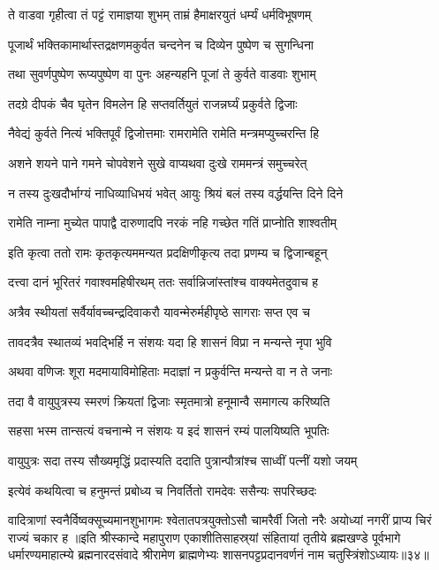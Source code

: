 \twolineshloka
{ते वाडवा गृहीत्वा तं पट्टं रामाज्ञया शुभम्}
{ताम्रं हैमाक्षरयुतं धर्म्यं धर्मविभूषणम्}%

\twolineshloka
{पूजार्थं भक्तिकामार्थास्तद्रक्षणमकुर्वत}
{चन्दनेन च दिव्येन पुष्पेण च सुगन्धिना}%

\twolineshloka
{तथा सुवर्णपुष्पेण रूप्यपुष्पेण वा पुनः}
{अहन्यहनि पूजां ते कुर्वते वाडवाः शुभाम्}%

\twolineshloka
{तदग्रे दीपकं चैव घृतेन विमलेन हि}
{सप्तवर्तियुतं राजन्नर्घ्यं प्रकुर्वते द्विजाः}%

\twolineshloka
{नैवेद्यं कुर्वते नित्यं भक्तिपूर्वं द्विजोत्तमाः}
{रामरामेति रामेति मन्त्रमप्युच्चरन्ति हि}%

\twolineshloka
{अशने शयने पाने गमने चोपवेशने}
{सुखे वाप्यथवा दुःखे राममन्त्रं समुच्चरेत्}%

\twolineshloka
{न तस्य दुःखदौर्भाग्यं नाधिव्याधिभयं भवेत्}
{आयुः श्रियं बलं तस्य वर्द्धयन्ति दिने दिने}%

\twolineshloka
{रामेति नाम्ना मुच्येत पापाद्वै दारुणादपि}
{नरकं नहि गच्छेत गतिं प्राप्नोति शाश्वतीम्}%


\twolineshloka
{इति कृत्वा ततो रामः कृतकृत्यममन्यत}
{प्रदक्षिणीकृत्य तदा प्रणम्य च द्विजान्बहून्}%

\twolineshloka
{दत्त्वा दानं भूरितरं गवाश्वमहिषीरथम्}
{ततः सर्वान्निजांस्तांश्च वाक्यमेतदुवाच ह}%

\twolineshloka
{अत्रैव स्थीयतां सर्वैर्यावच्चन्द्रदिवाकरौ}
{यावन्मेरुर्महीपृष्ठे सागराः सप्त एव च}%

\twolineshloka
{तावदत्रैव स्थातव्यं भवद्भिर्हि न संशयः}
{यदा हि शासनं विप्रा न मन्यन्ते नृपा भुवि}%

\twolineshloka
{अथवा वणिजः शूरा मदमायाविमोहिताः}
{मदाज्ञां न प्रकुर्वन्ति मन्यन्ते वा न ते जनाः}%

\twolineshloka
{तदा वै वायुपुत्रस्य स्मरणं क्रियतां द्विजाः}
{स्मृतमात्रो हनूमान्वै समागत्य करिष्यति}%

\twolineshloka
{सहसा भस्म तान्सत्यं वचनान्मे न संशयः}
{य इदं शासनं रम्यं पालयिष्यति भूपतिः}%

\twolineshloka
{वायुपुत्रः सदा तस्य सौख्यमृद्धिं प्रदास्यति}
{ददाति पुत्रान्पौत्रांश्च साध्वीं पत्नीं यशो जयम्}%

\twolineshloka
{इत्येवं कथयित्वा च हनुमन्तं प्रबोध्य च}
{निवर्तितो रामदेवः ससैन्यः सपरिच्छदः}%

\threelineshloka
{वादित्राणां स्वनैर्विष्वक्सूच्यमानशुभागमः}
{श्वेतातपत्रयुक्तोऽसौ चामरैर्वी जितो नरैः}
{अयोध्यां नगरीं प्राप्य चिरं राज्यं चकार ह}%
॥इति श्रीस्कान्दे महापुराण एकाशीतिसाहस्र्यां संहितायां तृतीये ब्रह्मखण्डे पूर्वभागे धर्मारण्यमाहात्म्ये ब्रह्मनारदसंवादे श्रीरामेण ब्राह्मणेभ्यः शासनपट्टप्रदानवर्णनं नाम चतुस्त्रिंशोऽध्यायः॥३४॥

